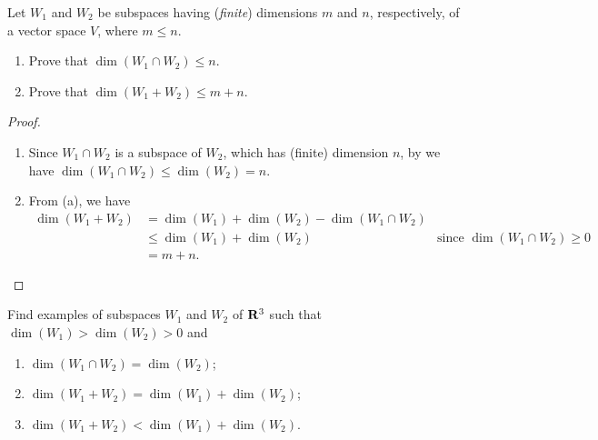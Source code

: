 \begin{exercise} \label{exercise 1.6.31}
Let \(W_1\) and \(W_2\) be subspaces having (\emph{finite}) dimensions \(m\) and \(n\), respectively, of a vector space \(V\), where \(m \le n\).
\begin{enumerate}
\item Prove that \(\dim(W_1 \cap W_2) \le n\).
\item Prove that \(\dim(W_1 + W_2) \le m + n\).
\end{enumerate}
\end{exercise}

\begin{proof} \ 

\begin{enumerate}
\item Since \(W_1 \cap W_2\) is a subspace of \(W_2\), which has (finite) dimension \(n\), by  we have \(\dim(W_1 \cap W_2) \le \dim(W_2) = n\).
\item From (a), we have
    \begin{align*}
        \dim(W_1 + W_2) & = \dim(W_1) + \dim(W_2) - \dim(W_1 \cap W_2) \\
                        & \le \dim(W_1) + \dim(W_2) & \text{since \(\dim(W_1 \cap W_2) \ge 0\)} \\
                        & = m + n.
    \end{align*}
\end{enumerate}
\end{proof}

\begin{exercise} \label{exercise 1.6.32}
Find examples of subspaces \(W_1\) and \(W_2\) of \(\mathbf{R}^3\) such that \(\dim(W_1) > \dim(W_2) > 0\) and
\begin{enumerate}
\item \(\dim(W_1 \cap W_2) = \dim(W_2)\);
\item \(\dim(W_1 + W_2) = \dim(W_1) + \dim(W_2)\);
\item \(\dim(W_1 + W_2) < \dim(W_1) + \dim(W_2)\).
\end{enumerate}
\end{exercise}

